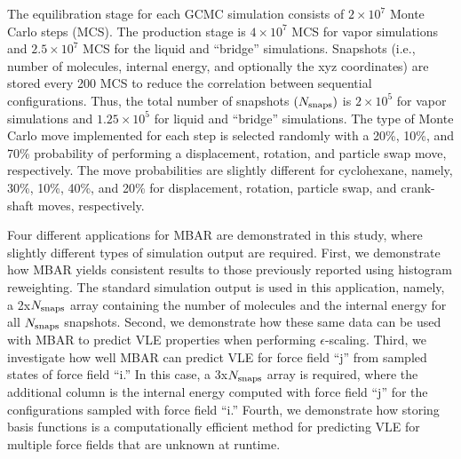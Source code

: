 \documentclass[journal=jced,manuscript=article]{achemso}
\begin{document}
The equilibration stage for each GCMC simulation consists of $2 \times 10^7$ Monte Carlo steps (MCS). The production stage is $4 \times 10^7$ MCS for vapor simulations and $2.5 \times 10^7$ MCS for the liquid and ``bridge'' simulations. Snapshots (i.e., number of molecules, internal energy, and optionally the xyz coordinates) are stored every 200 MCS to reduce the correlation between sequential configurations. Thus, the total number of snapshots $(N_{\rm snaps})$ is $2 \times 10^5$ for vapor simulations and $1.25 \times 10^5$ for liquid and ``bridge'' simulations. The type of Monte Carlo move implemented for each step is selected randomly with a 20\%, 10\%, and 70\% probability of performing a displacement, rotation, and particle swap move, respectively. The move probabilities are slightly different for cyclohexane, namely, 30\%, 10\%, 40\%, and 20\% for displacement, rotation, particle swap, and crank-shaft moves, respectively.  


Four different applications for MBAR are demonstrated in this study, where slightly different types of simulation output are required. First, we demonstrate how MBAR yields consistent results to those previously reported using histogram reweighting. The standard simulation output is used in this application, namely, a 2x$N_{\rm snaps}$ array containing the number of molecules and the internal energy for all $N_{\rm snaps}$ snapshots. Second, we demonstrate how these same data can be used with MBAR to predict VLE properties when performing $\epsilon$-scaling. Third, we investigate how well MBAR can predict VLE for force field ``j'' from sampled states of force field ``i.'' In this case, a 3x$N_{\rm snaps}$ array is required, where the additional column is the internal energy computed with force field ``j'' for the configurations sampled with force field ``i.'' Fourth, we demonstrate how storing basis functions is a computationally efficient method for predicting VLE for multiple force fields that are unknown at runtime.   

\end{document}
